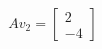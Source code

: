 \documentclass{article}
\begin{document}
\begin{align*}
Av_2 = \begin{bmatrix}2\\-4\end{bmatrix}
\end{align*}
\end{document}
